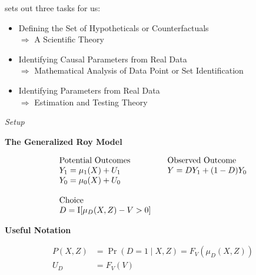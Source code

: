 \begin{frame}
\citet{Heckman.2008a} sets out three tasks for us:

\begin{itemize}
\item Defining the Set of Hypotheticals or Counterfactuals \\\hspace{0.3cm}
    $\Rightarrow$ A Scientific Theory
\item Identifying Causal Parameters from Real Data \\\hspace{0.3cm}
    $\Rightarrow$ Mathematical Analysis of  Data Point or Set Identification
\item Identifying Parameters from Real Data\\\vspace{0.3cm}\hspace{0.3cm}
    $\Rightarrow$ Estimation and Testing Theory
\end{itemize}

\end{frame}
\begin{frame}\begin{center}
\LARGE\textit{Setup}
\end{center}\end{frame}
\begin{frame}
\textbf{The Generalized Roy Model}

\begin{align*}\begin{array}{l@{\qquad}l}
\text{Potential Outcomes} &\text{Observed Outcome}\\
Y_1 = \mu_1(X) + U_1      &  Y = D Y_1 + (1 - D)Y_0 \\
Y_0 = \mu_0(X) + U_0      &\\
    & \\
\text{Choice} & \\
D = \mathrm{I}[\mu_D(X, Z) - V > 0] & \\
\end{array}
\end{align*}
\end{frame}

\begin{frame}
\textbf{Useful Notation}

\begin{align*}
P(X, Z) & = \Pr(D = 1\mid X, Z) = F_V(\mu_D(X, Z)) \\
U_D     & = F_V(V)
\end{align*}

\end{frame}

